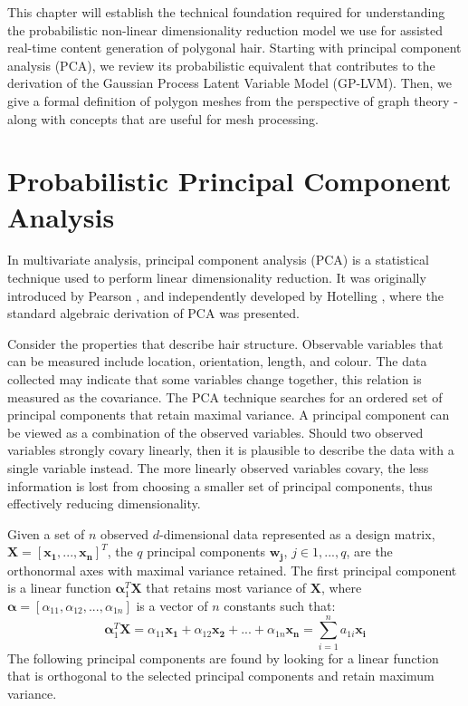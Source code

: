\documentclass[ %
author={Dillon Keith Diep},
supervisor={Dr. Carl Henrik Ek},
degree={MEng},
title={ART-CG:},
subtitle={Assisted Real-time Content Generation of 3D Hair by Learning Manifolds},
type={Research},
year={2017} ]{dissertation}
\begin{document}
This chapter will establish the technical foundation required for understanding the probabilistic non-linear dimensionality reduction model we use for assisted real-time content generation of polygonal hair. Starting with principal component analysis (PCA), we review its probabilistic equivalent that contributes to the derivation of the Gaussian Process Latent Variable Model (GP-LVM). Then, we give a formal definition of polygon meshes from the perspective of graph theory - along with concepts that are useful for mesh processing.

\section{Probabilistic Principal Component Analysis}
In multivariate analysis, principal component analysis (PCA) is a statistical technique used to perform linear dimensionality reduction. It was originally introduced by Pearson \cite{pca1901}, and independently developed by Hotelling \cite{pca1933}, where the standard algebraic derivation of PCA was presented.

Consider the properties that describe hair structure. Observable variables that can be measured include location, orientation, length, and colour. The data collected may indicate that some variables change together, this relation is measured as the covariance. The PCA technique searches for an ordered set of principal components that retain maximal variance. A principal component can be viewed as a combination of the observed variables. Should two observed variables strongly covary linearly, then it is plausible to describe the data with a single variable instead. The more linearly observed variables covary, the less information is lost from choosing a smaller set of principal components, thus effectively reducing dimensionality.

Given a set of $n$ observed $d$-dimensional data represented as a design matrix, $\bm{X=[x_1,...,x_n]}^T$, the $q$ principal components $\bm{w_j}$, $j \in {1,...,q}$, are the orthonormal axes with maximal variance retained. The first principal component is a linear function $\bm{\alpha}^T_1\bm{X}$ that retains most variance of $\bm{X}$, where $\bm{\alpha} = [\alpha_{11}, \alpha_{12}, ..., \alpha_{1n}]$ is a vector of $n$ constants such that:
$$\bm{\alpha}^T_1\bm{X}=\alpha_{11}\bm{x_1}+\alpha_{12}\bm{x_2}+...+\alpha_{1n}\bm{x_n} = \sum^n_{i=1}a_{1i}\bm{x_i}$$
The following principal components are found by looking for a linear function that is orthogonal to the selected principal components and retain maximum variance.
\end{document}
